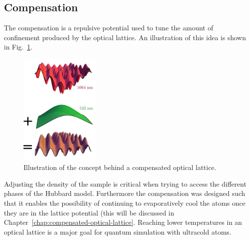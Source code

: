 \subsection{Compensation} 

The compensation is a repulsive potential used to tune the amount of
confinement produced by the optical lattice.  An illustration of this idea is
shown in Fig.~\ref{fig:green-push-cartoon}. 
\begin{figure}
\centering
\includegraphics[width=0.35\textwidth]{../figures/setup-overview/compensation-push-cartoon.png}
\caption[Compensation]{\small Illustration of the concept behind a compensated
optical lattice. }  
\label{fig:green-push-cartoon} 
\end{figure}
Adjusting the density of the sample is critical when trying to access the
different phases of the Hubbard model.  Furthermore the compensation was
designed such that it enables the possibility of continuing to evaporatively
cool the atoms once they are in the lattice potential (this will be discussed
in Chapter~\ref{chap:compensated-optical-lattice}.  Reaching lower temperatures
in an optical lattice is a major goal for quantum simulation with ultracold
atoms. 

